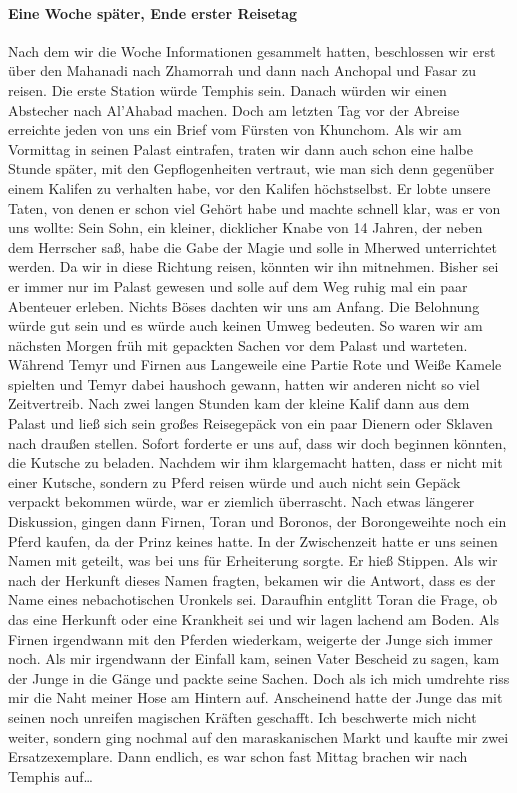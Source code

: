 \paragraph{Eine Woche später, Ende erster Reisetag}
Nach dem wir die Woche Informationen gesammelt hatten, beschlossen wir erst über den Mahanadi nach Zhamorrah und dann nach Anchopal und Fasar zu reisen. Die erste Station würde Temphis sein. Danach würden wir einen Abstecher nach Al'Ahabad machen. Doch am letzten Tag vor der Abreise erreichte jeden von uns ein Brief vom Fürsten von Khunchom. Als wir am Vormittag in seinen Palast eintrafen, traten wir dann auch schon eine halbe Stunde später, mit den Gepflogenheiten vertraut, wie man sich denn gegenüber einem Kalifen zu verhalten habe, vor den Kalifen höchstselbst. Er lobte unsere Taten, von denen er schon viel Gehört habe und machte schnell klar, was er von uns wollte: Sein Sohn, ein kleiner, dicklicher Knabe von 14 Jahren, der neben dem Herrscher saß, habe die Gabe der Magie und solle in Mherwed unterrichtet werden. Da wir in diese Richtung reisen, könnten wir ihn mitnehmen. Bisher sei er immer nur im Palast gewesen und solle auf dem Weg ruhig mal ein paar Abenteuer erleben. Nichts Böses dachten wir uns am Anfang. Die Belohnung würde gut sein und es würde auch keinen Umweg bedeuten. So waren wir am nächsten Morgen früh mit gepackten Sachen vor dem Palast und warteten. Während Temyr und Firnen aus Langeweile eine Partie Rote und Weiße Kamele spielten und Temyr dabei haushoch gewann, hatten wir anderen nicht so viel Zeitvertreib. Nach zwei langen Stunden kam der kleine Kalif dann aus dem Palast und ließ sich sein großes Reisegepäck von ein paar Dienern oder Sklaven nach draußen stellen. Sofort forderte er uns auf, dass wir doch beginnen könnten, die Kutsche zu beladen. Nachdem wir ihm klargemacht hatten, dass er nicht mit einer Kutsche, sondern zu Pferd reisen würde und auch nicht sein Gepäck verpackt bekommen würde, war er ziemlich überrascht. Nach etwas längerer Diskussion, gingen dann Firnen, Toran und Boronos, der Borongeweihte noch ein Pferd kaufen, da der Prinz keines hatte. In der Zwischenzeit hatte er uns seinen Namen mit geteilt, was bei uns für Erheiterung sorgte. Er hieß Stippen. Als wir nach der Herkunft dieses Namen fragten, bekamen wir die Antwort, dass es der Name eines nebachotischen Uronkels sei. Daraufhin entglitt Toran die Frage, ob das eine Herkunft oder eine Krankheit sei und wir lagen lachend am Boden. Als Firnen irgendwann mit den Pferden wiederkam, weigerte der Junge sich immer noch. Als mir irgendwann der Einfall kam, seinen Vater Bescheid zu sagen, kam der Junge in die Gänge und packte seine Sachen. Doch als ich mich umdrehte riss mir die Naht meiner Hose am Hintern auf. Anscheinend hatte der Junge das mit seinen noch unreifen magischen Kräften geschafft. Ich beschwerte mich nicht weiter, sondern ging nochmal auf den maraskanischen Markt und kaufte mir zwei Ersatzexemplare. Dann endlich, es war schon fast Mittag brachen wir nach Temphis auf\dots

